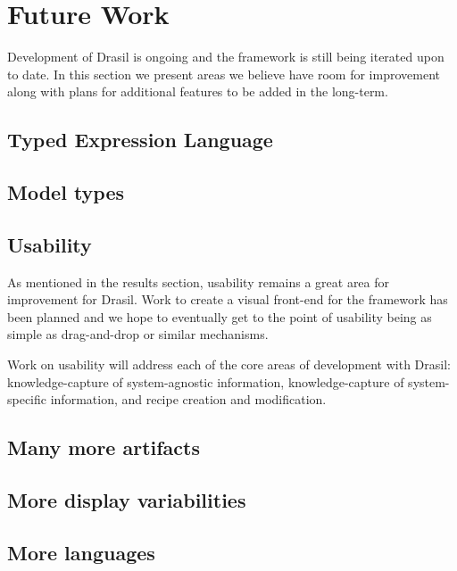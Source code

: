 \chapter{Future Work}

Development of Drasil is ongoing and the framework is still being iterated upon
to date. In this section we present areas we believe have room for improvement
along with plans for additional features to be added in the long-term.

\section{Typed Expression Language}

\section{Model types}
\section{Usability}
As mentioned in the results section, usability remains a great area for
improvement for Drasil. Work to create a visual front-end for the framework
has been planned and we hope to eventually get to the point of usability being
as simple as drag-and-drop or similar mechanisms.

Work on usability will address each of the core areas of development with
Drasil: knowledge-capture of system-agnostic information,
knowledge-capture of system-specific information, and recipe creation and
modification.
\section{Many more artifacts}
\section{More display variabilities}
\section{More languages}

